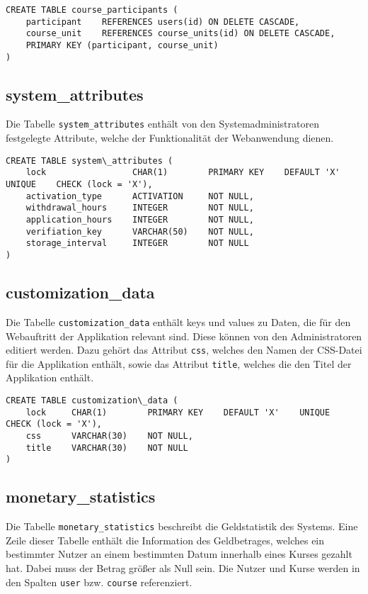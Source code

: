 \begin{verbatim}
CREATE TABLE course_participants (
    participant    REFERENCES users(id) ON DELETE CASCADE,
    course_unit    REFERENCES course_units(id) ON DELETE CASCADE,
    PRIMARY KEY (participant, course_unit)
)
\end{verbatim}

\subsection{system\_attributes}
Die Tabelle \texttt{system\_attributes} enthält von den Systemadministratoren festgelegte Attribute, welche der Funktionalität der Webanwendung dienen.

\begin{verbatim}
CREATE TABLE system\_attributes (
	lock                 CHAR(1)        PRIMARY KEY    DEFAULT 'X'    UNIQUE    CHECK (lock = 'X'),
    activation_type      ACTIVATION     NOT NULL,
    withdrawal_hours     INTEGER        NOT NULL,
    application_hours    INTEGER        NOT NULL,
    verifiation_key      VARCHAR(50)    NOT NULL,
    storage_interval     INTEGER        NOT NULL
)
\end{verbatim}

\subsection{customization\_data}
Die Tabelle \texttt{customization\_data} enthält keys und values zu Daten, die für den Webauftritt der Applikation relevant sind. Diese können von den Administratoren editiert werden. Dazu gehört das Attribut \texttt{css}, welches den Namen der CSS-Datei für die Applikation enthält, sowie das Attribut \texttt{title}, welches die den Titel der Applikation enthält.

\begin{verbatim}
CREATE TABLE customization\_data (
    lock     CHAR(1)        PRIMARY KEY    DEFAULT 'X'    UNIQUE    CHECK (lock = 'X'),
    css      VARCHAR(30)    NOT NULL,
    title    VARCHAR(30)    NOT NULL
)
\end{verbatim}

\subsection{monetary\_statistics}
Die Tabelle \texttt{monetary\_statistics} beschreibt die Geldstatistik des Systems. Eine Zeile dieser Tabelle enthält die Information des Geldbetrages, welches ein bestimmter Nutzer an einem bestimmten Datum innerhalb eines Kurses gezahlt hat. Dabei muss der Betrag größer als Null sein. Die Nutzer und Kurse werden in den Spalten \texttt{user} bzw. \texttt{course} referenziert.

